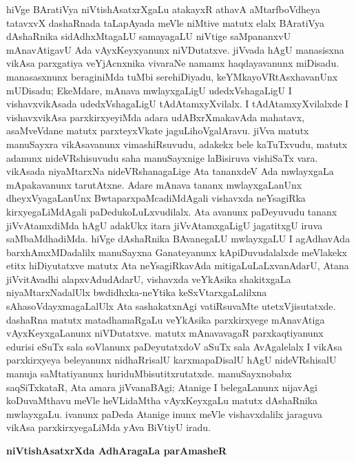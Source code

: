 hiVge BAratiVya niVtishAsatxrXgaLu atakayxR athavA aMtarfboVdheya tatavxvX dashaRnada taLapAyada meVle niMtive matutx elalx BAratiVya dAshaRnika sidAdhxMtagaLU samayagaLU niVtige saMpananxvU mAnavAtigavU Ada vAyxKeyxyanunx niVDutatxve. jiVvada hAgU manasisxna vikAsa parxgatiya veYjAcnxnika vivaraNe namamx haqdayavanunx miDisadu. manasasxnunx beraginiMda tuMbi serehiDiyadu, keYMkayoVRtAsxhavanUnx mUDisadu; EkeMdare, mAnava mwlayxgaLigU udedxVshagaLigU I vishavxvikAsada udedxVshagaLigU tAdAtamxyXvilalx. I tAdAtamxyXvilalxde I vishavxvikAsa parxkirxyeyiMda adara udABxrXmakavAda mahatavx, asaMveVdane matutx parxteyxVkate jaguLihoVgalAravu. jiVva matutx manuSayxra vikAsavanunx vimashiRsuvudu, adakekx bele kaTuTxvudu, matutx adanunx nideVRshisuvudu saha manuSayxnige laBisiruva vishiSaTx vara. vikAsada niyaMtarxNa nideVRshanagaLige Ata tananxdeV Ada mwlayxgaLa mApakavanunx tarutAtxne. Adare mAnava tananx mwlayxgaLanUnx dheyxVyagaLanUnx BwtaparxpaMcadiMdAgali vishavxda neYsagiRka kirxyegaLiMdAgali paDedukoLuLxvudilalx. Ata avanunx paDeyuvudu tananx jiVvAtamxdiMda hAgU adakUkx itara jiVvAtamxgaLigU jagatitxgU iruva saMbaMdhadiMda. hiVge dAshaRnika BAvanegaLU mwlayxgaLU I agAdhavAda barxhAmxMDadalilx manuSayxna Ganateyanunx kApiDuvudalalxde meVlakekx etitx hiDiyutatxve matutx Ata neYsagiRkavAda mitigaLuLaLxvanAdarU, Atana jiVvitAvadhi alapxvAdudAdarU, vishavxda veYkAsika shakitxgaLa niyaMtarxNadalUlx bwdidhxka-neYtika keSxVtarxgaLalilxna sAhasoVdayxmagaLalUlx Ata sashakatxnAgi vatiRsuvaMte utetxVjisutatxde. dashaRna matutx matadhamaRgaLu veYkAsika parxkirxyege mAnavAtiga vAyxKeyxgaLanunx niVDutatxve. matutx mAnavavagaR parxkaqtiyanunx edurisi eSuTx sala soVlanunx paDeyutatxdoV aSuTx sala AvAgalelalx I vikAsa parxkirxyeya beleyanunx nidhaRrisalU karxmapaDisalU hAgU nideVRshisalU manuja saMtatiyanunx huriduMbisutitxrutatxde. manuSayxnobabx saqSiTxkataR, Ata amara jiVvanaBAgi; Atanige I belegaLanunx nijavAgi koDuvaMthavu meVle heVLidaMtha vAyxKeyxgaLu matutx dAshaRnika mwlayxgaLu. ivanunx paDeda Atanige inunx meVle vishavxdalilx jaraguva vikAsa parxkirxyegaLiMda yAva BiVtiyU iradu.

\bigskip
\begin{center}
{\Large\bf niVtishAsatxrXda AdhAragaLa parAmasheR}
\end{center}

